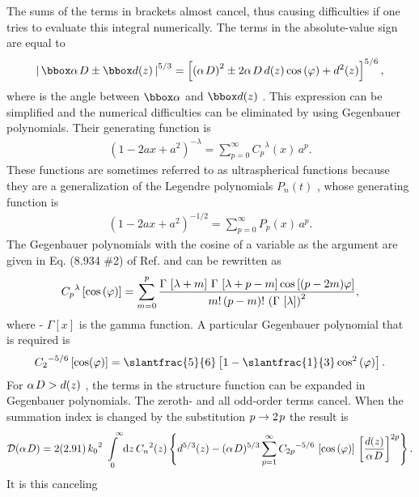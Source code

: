 The sums of the terms in  brackets almost cancel, thus causing
difficulties if one tries to  evaluate this integral numerically.
The terms in the absolute-value  sign are equal to
\begin{eqnarray}\left| {\,{\bbox \alpha}  \kern 1ptD\pm {\bbox
d}(z)\,} \right|^{5/ 3}=\left[ {\left( {\alpha \kern  1ptD}
\right)^2\pm 2\alpha \kern 1ptD\,d(z)\cos \left( \varphi
\right)+d^2(z)} \right]^{5/ 6},\end{eqnarray}  where  is the angle
between  ${\bbox \alpha} $  and  ${\bbox d}( z )$ .    This
expression can be simplified and  the numerical difficulties can be
eliminated by using Gegenbauer  polynomials.\cite{8}  Their
generating function is  \begin{eqnarray}\left( {1-2ax+a^2}
\right)^{-\lambda }=\sum\limits_{p=0}^\infty  {{C_p}^\lambda
(x)\,a^p}. \end{eqnarray}   These functions are sometimes referred
to as ultraspherical functions because they are a generalization of
the Legendre polynomials  $P_n(t)$ , whose generating function is
\begin{eqnarray}\left( {1- 2ax+a^2} \right)^{-1/
2}=\sum\limits_{p=0}^\infty  {P_p(x)\,a^p}.\end{eqnarray}      The
Gegenbauer polynomials with the cosine of a variable as the
argument are given in Eq. (8.934  \#2) of Ref.   and
can be rewritten as  \begin{eqnarray}{C_p}^\lambda \left[ {\cos
\left( \varphi   \right)} \right]=\sum\limits_{m=0}^p
{}{{\Gamma\,\left[ {\lambda +m}  \right]\,\Gamma\,\left[ {\lambda
+p-m} \right]\cos \left[ {(p-2m)\varphi }  \right]} \over
{m!\,(p-m)!\,\left( {\Gamma\,\left[ \lambda  \right]}
\right)^2}},\end{eqnarray}     where - $\Gamma\left[ x \right]$  is
the gamma function.  A particular Gegenbauer  polynomial that is
required is  \begin{eqnarray}{C_2}^{-5/ 6}\left[ {\cos (\varphi )}
\right]={\textstyle{\slantfrac{5}{6}}}\left[ {1- {\textstyle{
\slantfrac{1}{3}}}\cos ^2\left( \varphi  \right)} \right].
\end{eqnarray}   For  $\alpha \kern 1ptD>d(z)$ , the terms in the
structure function can  be expanded in Gegenbauer polynomials.  The
zeroth- and all odd-order  terms cancel.  When the summation index
is changed by the substitution  $p\to 2\kern 1ptp$  the result is
\begin{eqnarray} {\cal D}(\alpha \kern
1ptD)=2(2.91)\,{k_0}^2\int\limits_{\,\,\, 0}^{\,\,\,\,\,\,\infty}{\rm
d}z\,{C_n}^2(z) \left\{ {d^{5/  3}(z)- (\alpha \kern 1ptD)^{5/
3}\sum\limits_{p=1}^\infty  {{C_{2p}}^{- 5/ 6}\,\left[ {\cos \left(
\varphi  \right)} \right]}\,\left[ {{{d(z)}  \over {\alpha \kern
1ptD}}} \right]^{2p}} \right\}.\end{eqnarray} It is this  canceling
